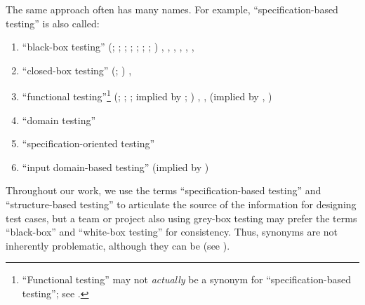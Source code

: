 The same approach often has many names. For example,
``specification-based testing'' is also called:
\begin{enumerate}
    \item ``black-box testing''
          \ifnotpaper
              (\citealp[p.~9]{IEEE2022}; \citeyear[p.~8]{IEEE2021};
              \citeyear[p.~431]{IEEE2017}; \citealp[p.~5\=/10]{SWEBOK2024};
              \citealpISTQB{}; \citealp[p.~46 (without hyphen)]{Firesmith2015};
              \citealp[p.~344]{SakamotoEtAl2013}; \citealp[p.~399]{vanVliet2000})
          \else
              \cite[p.~399]{vanVliet2000}, \cite[p.~5\=/10]{SWEBOK2024},
              \cite[p.~431]{IEEE2017}, \cite[p.~9]{IEEE2022}, \cite{ISTQB},
              \cite[p.~8]{IEEE2021}, %
              \cite[p.~344]{SakamotoEtAl2013}
          \fi
    \item ``closed-box testing''
          \ifnotpaper
              (\citealp[p.~9]{IEEE2022}; \citeyear[p.~431]{IEEE2017})
          \else
              \cite[p.~431]{IEEE2017}, \cite[p.~9]{IEEE2022}
          \fi
    \item ``functional testing''\footnote{``Functional testing'' may not
              \emph{actually} be a synonym for ``specification-based testing'';
              see .}
          \ifnotpaper
              (\citealp[p.~196]{IEEE2017}; \citealp[p.~44]{Kam2008};
              \citealp[p.~399]{vanVliet2000}; implied by
              \citealp[p.~129]{IEEE2021}; \citeyear[p.~431]{IEEE2017})
          \else
              \cite[p.~399]{vanVliet2000}, \cite[p.~196]{IEEE2017},
              \cite[p.~44]{Kam2008} (implied by \cite[p.~431]{IEEE2017},
              \cite[p.~129]{IEEE2021})
          \fi
    \item ``domain testing'' \citep[p.~5\=/10]{SWEBOK2024}
    \item ``specification-oriented testing'' \citep[p.~440, Fig.~12.2]{PetersAndPedrycz2000}
    \item ``input domain-based testing'' (implied by \citealp[pp.~4\=/7 to
              4\=/8]{SWEBOK2014})
\end{enumerate}
Throughout our work, we use the terms
``specification-based testing'' and ``structure-based testing'' to articulate
the source of the information for designing test cases, but a team or project
also using grey-box testing may prefer the terms ``black-box'' and ``white-box
testing'' for consistency. Thus, synonyms are not inherently problematic,
although they can be (see ).

